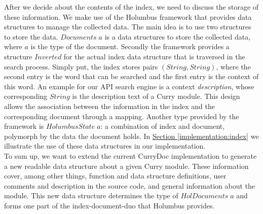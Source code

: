 \documentclass[%
	pdftex,%
	a4paper,%
	oneside,%
	chapterprefix,%
	headsepline,%
	12pt%
]{scrbook}
\newcommand{\Conid}[1]{\mathit{#1}}
\newcommand{\Varid}[1]{\mathit{#1}}
\begin{document}




After we decide about the contents of the index, we need to discuss
the storage of these information. We make use of the Holumbus
framework that provides data structures to manage the collected
data. The main idea is to use two structures to store the data.
\ensuremath{\Conid{Documents}\;\Varid{a}} is a data structures to store the collected data, where
\ensuremath{\Varid{a}} is the type of the document. Secondly the framework provides a
structure \ensuremath{\Conid{Inverted}} for the actual index data structure that is
traversed in the search process. Simply put, the index stores pairs
\ensuremath{(\Conid{String},\Conid{String})}, where the second entry is the word that can be
searched and the first entry is the context of this word. An example
for our API search engine is a context \emph{description}, whose
corresponding \ensuremath{\Conid{String}} is the description text of a Curry module. This
design allows the association between the information in the index and
the corresponding document through a mapping. Another type provided by
the framework is \ensuremath{\Conid{HolumbusState}\;\Varid{a}}: a combination of index and
document, polymorph by the data the document holds. In
\hyperref[implementation:index]{Section \ref{implementation:index}} we
illustrate the use of these data
structures in our implementation.\\

To sum up, we want to extend the current CurryDoc implementation to
generate a new readable data structure about a given Curry
module. These information cover, among other things, function and data
structure definitions, user comments and description in the source
code, and general information about the module. This new data
structure determines the type of \ensuremath{\Conid{HolDocuments}\;\Varid{a}} and forms one part
of the index-document-duo that Holumbus provides. 
\end{document}
